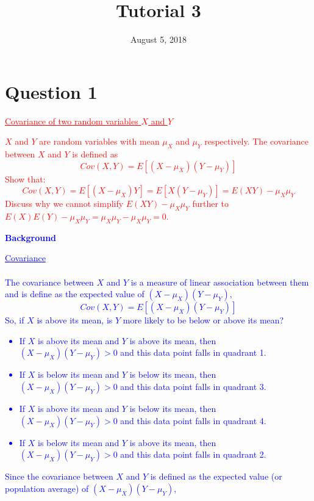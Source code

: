 \documentclass[12pt]{report}
\title{Tutorial 3}
\subtitle
{
	\textbf{keywords}: covariance, expected value, diversification, variance, risk, vector, matrix
	
	\textbf{estimated reading time}: 30 minutes
}
\date{August 5, 2018}
\newenvironment{blueframed}[1][blue]
{\def\FrameCommand{\fboxsep=\FrameSep\fcolorbox{#1}{white}}%
\MakeFramed {\advance\hsize-\width \FrameRestore}}
{\endMakeFramed}
\begin{document}
	
\maketitle

\section*{Question 1}
\textcolor{red}{\underline{Covariance of two random variables $X$ and $Y$}}

\noindent \textcolor{red}{$X$ and $Y$ are random variables with mean $\mu_X$ and $\mu_Y$ respectively. The covariance between $X$ and $Y$ is defined as $$Cov(X,Y) = E[(X-\mu_X)(Y-\mu_Y)]$$ Show that: $$Cov(X,Y) = E[(X-\mu_X)Y] = E[X(Y-\mu_Y)] = E(XY) - \mu_X \mu_Y$$ Discuss why we cannot simplify $E(XY) - \mu_X \mu_Y$ further to $E(X)E(Y) - \mu_X \mu_Y = \mu_X \mu_Y - \mu_X \mu_Y = 0$.}

\justify
\begin{blueframed}
	\textcolor{blue}{\textbf{Background}}
	\vspace{-\baselineskip}
	\justify
	\textcolor{blue}{\underline{Covariance} \\ \\ The covariance between $X$ and $Y$ is a measure of linear association between them and is define as the expected value of $(X-\mu_X)(Y-\mu_Y)$, $$Cov(X,Y) = E[(X-\mu_X)(Y-\mu_Y)]$$ So, if $X$ is above its mean, is $Y$ more likely to be below or above its mean? \begin{itemize}
			\item If $X$ is above its mean and $Y$ is above its mean, then $(X-\mu_X)(Y-\mu_Y) > 0$ and this data point falls in quadrant 1.
			\item If $X$ is below its mean and $Y$ is below its mean, then $(X-\mu_X)(Y-\mu_Y) > 0$ and this data point falls in quadrant 3.
			\item If $X$ is above its mean and $Y$ is below its mean, then $(X-\mu_X)(Y-\mu_Y) > 0$ and this data point falls in quadrant 4.
			\item If $X$ is below its mean and $Y$ is above its mean, then $(X-\mu_X)(Y-\mu_Y) > 0$ and this data point falls in quadrant 2.
		\end{itemize} Since the covariance between $X$ and $Y$ is defined as the expected value (or population average) of $(X-\mu_X)(Y-\mu_Y)$,}
\end{blueframed}
\end{document}
